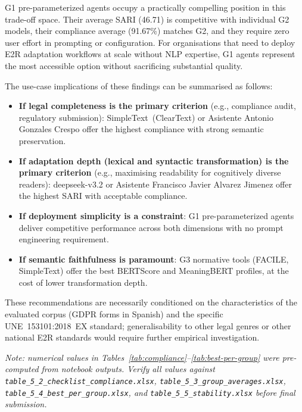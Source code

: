 \documentclass[12pt, a4paper]{article}
\begin{document}
G1 pre-parameterized agents occupy a practically compelling position in this trade-off
space. Their average SARI (46.71) is competitive with individual G2 models, their
compliance average (91.67\%) matches G2, and they require zero user effort in prompting
or configuration. For organisations that need to deploy E2R adaptation workflows at scale
without NLP expertise, G1 agents represent the most accessible option without sacrificing
substantial quality.

The use-case implications of these findings can be summarised as follows:

\begin{itemize}
  \item \textbf{If legal completeness is the primary criterion} (e.g., compliance audit,
    regulatory submission): SimpleText~(ClearText) or Asistente Antonio Gonzales Crespo
    offer the highest compliance with strong semantic preservation.
  \item \textbf{If adaptation depth (lexical and syntactic transformation) is the primary
    criterion} (e.g., maximising readability for cognitively diverse readers):
    deepseek-v3.2 or Asistente Francisco Javier Alvarez Jimenez offer the highest SARI
    with acceptable compliance.
  \item \textbf{If deployment simplicity is a constraint}: G1 pre-parameterized agents
    deliver competitive performance across both dimensions with no prompt engineering
    requirement.
  \item \textbf{If semantic faithfulness is paramount}: G3 normative tools (FACILE,
    SimpleText) offer the best BERTScore and MeaningBERT profiles, at the cost of lower
    transformation depth.
\end{itemize}

These recommendations are necessarily conditioned on the characteristics of the evaluated
corpus (GDPR forms in Spanish) and the specific UNE~153101:2018~EX standard;
generalisability to other legal genres or other national E2R standards would require
further empirical investigation.

\bigskip
\noindent\textit{Note: numerical values in Tables~\ref{tab:compliance}--\ref{tab:best-per-group}
were pre-computed from notebook outputs. Verify all values against
\texttt{table\_5\_2\_checklist\_compliance.xlsx},
\texttt{table\_5\_3\_group\_averages.xlsx},
\texttt{table\_5\_4\_best\_per\_group.xlsx}, and
\texttt{table\_5\_5\_stability.xlsx} before final submission.}
\end{document}

